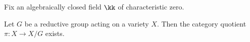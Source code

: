 Fix an algebraically closed field \( \kk\) of characteristic zero. 

\begin{theorem}\label{thm:category_quotient_exist_for_action_by_reductive_groups}
    Let \(G\) be a reductive group acting on a variety \(X\). 
    Then the category quotient \( \pi: X \to X/G\) exists.
\end{theorem}
